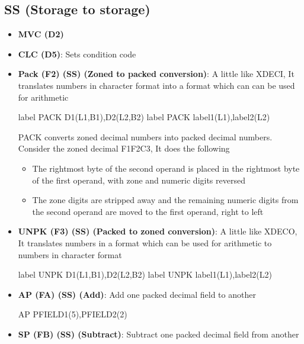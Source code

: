 \documentclass{report}
\begin{document}
    \subsection{SS (Storage to storage)}
    \begin{itemize}
        \item \textbf{MVC (D2)}
        \item \textbf{CLC (D5)}: Sets condition code
        \item \textbf{Pack (F2) (SS) (Zoned to packed conversion)}: A little like XDECI, It translates numbers in character format into a format which can can be used for arithmetic
            \bigbreak \noindent 
            \begin{cppcode}
                label PACK D1(L1,B1),D2(L2,B2)
                label PACK label1(L1),label2(L2)
            \end{cppcode}
            \bigbreak \noindent 
            PACK converts zoned decimal numbers into packed decimal numbers. Consider the zoned decimal F1F2C3, It does the following  
            \begin{itemize}
                \item The rightmost byte of the second operand is placed in the rightmost byte of the first operand, with zone and numeric digits reversed
                \item The zone digits are stripped away and the remaining numeric digits from the second operand are moved to the first operand, right to left
            \end{itemize}
        \item \textbf{UNPK (F3) (SS) (Packed to zoned conversion)}: A little like XDECO, It translates numbers in a format which can be used for arithmetic to numbers in character format
            \bigbreak \noindent 
            \begin{cppcode}
                label UNPK D1(L1,B1),D2(L2,B2)
                label UNPK label1(L1),label2(L2)
            \end{cppcode}
        \item \textbf{AP (FA) (SS) (Add)}: Add one packed decimal field to another
            \bigbreak \noindent 
            \begin{cppcode}
                AP PFIELD1(5),PFIELD2(2)
            \end{cppcode}
        \item \textbf{SP (FB) (SS) (Subtract)}: Subtract one packed decimal field from another
            \bigbreak \noindent 
            \begin{cppcode}

\end{cppcode}
\end{itemize}
\end{document}
